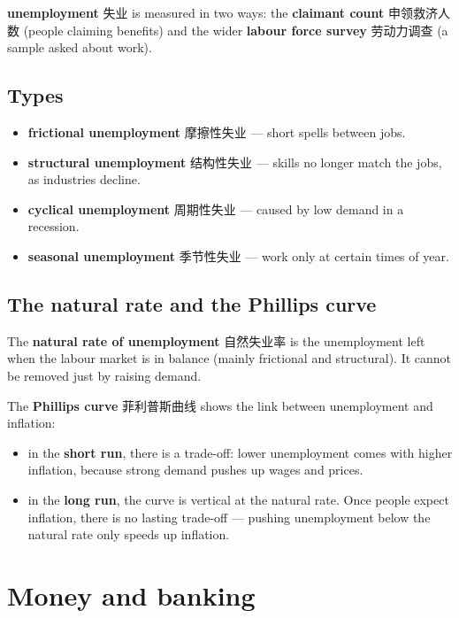 \documentclass[11pt]{article}
\begin{document}
\textbf{unemployment} 失业 is measured in two ways: the \textbf{claimant count} 申领救济人数 (people claiming benefits) and the wider \textbf{labour force survey} 劳动力调查 (a sample asked about work).

\subsection*{Types}

\begin{itemize}
\item \textbf{frictional unemployment} 摩擦性失业 — short spells between jobs.

\item \textbf{structural unemployment} 结构性失业 — skills no longer match the jobs, as industries decline.

\item \textbf{cyclical unemployment} 周期性失业 — caused by low demand in a recession.

\item \textbf{seasonal unemployment} 季节性失业 — work only at certain times of year.

\end{itemize}

\subsection*{The natural rate and the Phillips curve}

The \textbf{natural rate of unemployment} 自然失业率 is the unemployment left when the labour market is in balance (mainly frictional and structural). It cannot be removed just by raising demand.

The \textbf{Phillips curve} 菲利普斯曲线 shows the link between unemployment and inflation:

\begin{itemize}
\item in the \textbf{short run}, there is a trade-off: lower unemployment comes with higher inflation, because strong demand pushes up wages and prices.

\item in the \textbf{long run}, the curve is vertical at the natural rate. Once people expect inflation, there is no lasting trade-off — pushing unemployment below the natural rate only speeds up inflation.

\end{itemize}

\section*{Money and banking}
\end{document}
